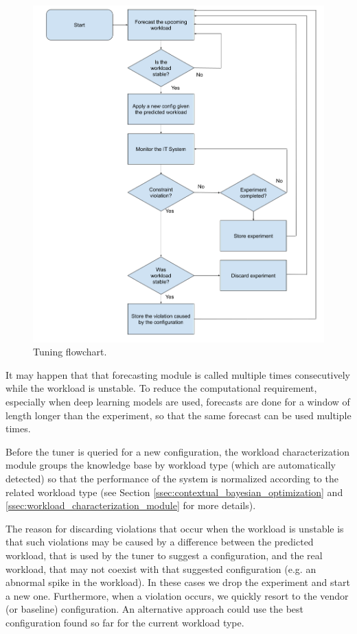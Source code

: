 \documentclass[a4paper, 12pt]{article} %
\begin{document}
	\begin{figure} \centering
		\includegraphics[width=\linewidth]{img/online_tuning_flowchart.png}
		\caption{Tuning flowchart.}
		\label{fig:online_tuning_flowchart}
	\end{figure}
	
	It may happen that that forecasting module is called multiple times consecutively while the workload is unstable. To reduce the computational requirement, especially when deep learning models are used, forecasts are done for a window of length longer than the experiment, so that the same forecast can be used multiple times.
	
	Before the tuner is queried for a new configuration, the workload characterization module groups the knowledge base by workload type (which are automatically detected) so that the performance of the system is normalized according to the related workload type (see Section \ref{ssec:contextual_bayesian_optimization} and \ref{ssec:workload_characterization_module} for more details).
	
	The reason for discarding violations that occur when the workload is unstable is that such violations may be caused by a difference between the predicted workload, that is used by the tuner to suggest a configuration, and the real workload, that may not coexist with that suggested configuration (e.g. an abnormal spike in the workload). In these cases we drop the experiment and start a new one. 
	Furthermore, when a violation occurs, we quickly resort to the vendor (or baseline) configuration. An alternative approach could use the best configuration found so far for the current workload type.
	
\end{document}
